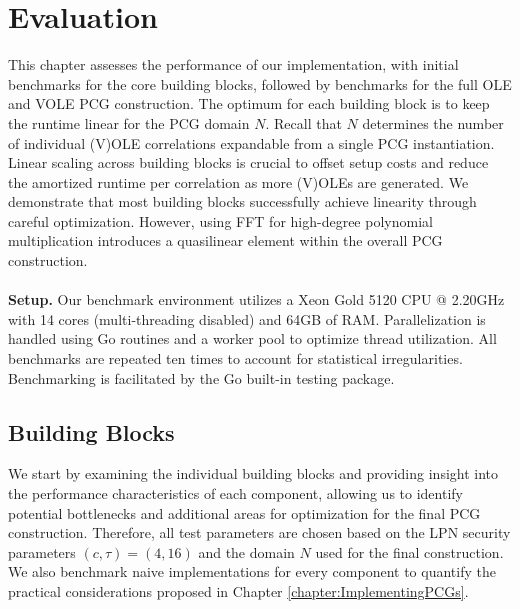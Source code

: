 \chapter{Evaluation}
\label{chapter:evaluation}
This chapter assesses the performance of our implementation, with initial benchmarks for the core building blocks, followed by benchmarks for the full OLE and VOLE PCG construction. The optimum for each building block is to keep the runtime linear for the PCG domain $N$. Recall that $N$ determines the number of individual (V)OLE correlations expandable from a single PCG instantiation. Linear scaling across building blocks is crucial to offset setup costs and reduce the amortized runtime per correlation as more (V)OLEs are generated. We demonstrate that most building blocks successfully achieve linearity through careful optimization. However, using FFT for high-degree polynomial multiplication introduces a quasilinear element within the overall PCG construction.
\\\\
\textbf{Setup.} Our benchmark environment utilizes a Xeon Gold 5120 CPU @ 2.20GHz with 14 cores (multi-threading disabled) and 64GB of RAM. Parallelization is handled using Go routines and a worker pool to optimize thread utilization. All benchmarks are repeated ten times to account for statistical irregularities. Benchmarking is facilitated by the Go built-in testing package. 

\section{Building Blocks}
We start by examining the individual building blocks and providing insight into the performance characteristics of each component, allowing us to identify potential bottlenecks and additional areas for optimization for the final PCG construction. Therefore, all test parameters are chosen based on the LPN security parameters $(c,\tau)=(4,16)$ and the domain $N$ used for the final construction. We also benchmark naive implementations for every component to quantify the practical considerations proposed in Chapter \ref{chapter:ImplementingPCGs}.

